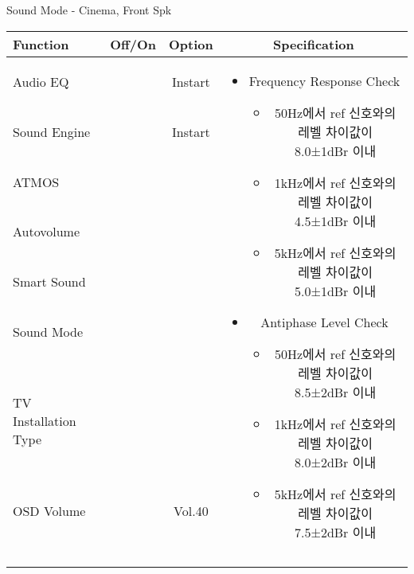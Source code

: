 \begin{frame}[t]{Sound Mode - Cinema, Front Spk}
\begin{tiny}
\begin{tabular}{@{}lccc@{}}
\toprule
Function & Off/On & Option & Specification \\
\midrule
Audio EQ & \color{black}{Off} & Instart &
\multirow{10}{60mm}{
\begin{itemize}
\item Frequency Response Check
	\begin{itemize}
	\item 50Hz에서 ref 신호와의 레벨 차이값이 8.0±1dBr 이내	
	\item 1kHz에서 ref 신호와의 레벨 차이값이 4.5±1dBr 이내
	\item 5kHz에서 ref 신호와의 레벨 차이값이 5.0±1dBr 이내
	\end{itemize}
\item Antiphase Level Check
	\begin{itemize}
	\item 50Hz에서 ref 신호와의 레벨 차이값이 8.5±2dBr 이내
	\item 1kHz에서 ref 신호와의 레벨 차이값이 8.0±2dBr 이내
	\item 5kHz에서 ref 신호와의 레벨 차이값이 7.5±2dBr 이내
	\end{itemize}
\end{itemize}
} \\
Sound Engine & \color{blue}{On} & Instart & \\
ATMOS & \color{black}{Off}  & & \\
Autovolume & \color{black}{Off} & & \\
Smart Sound & \color{black}{Off} & & \\
Sound Mode & \color{blue}{On} & \color{blue}{Cinema} & \\
TV Installation Type & \color{blue}{On} & \color{black}{Standtype1} & \\
OSD Volume & \color{blue}{On} & Vol.40 & \\
& & & \\
& & & \\
& & & \\
& & & \\\midrule
\end{tabular}
\end{tiny}


\end{frame}


